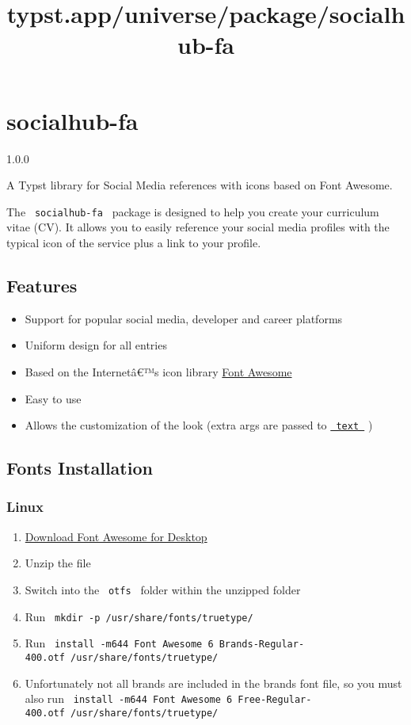 \title{typst.app/universe/package/socialhub-fa}

\label{banner}
\section{socialhub-fa}\label{socialhub-fa}

{ 1.0.0 }

A Typst library for Social Media references with icons based on Font
Awesome.

\label{readme}
The \texttt{\ socialhub-fa\ } package is designed to help you create
your curriculum vitae (CV). It allows you to easily reference your
social media profiles with the typical icon of the service plus a link
to your profile.

\subsection{Features}\label{features}

\begin{itemize}
\tightlist
\item
  Support for popular social media, developer and career platforms
\item
  Uniform design for all entries
\item
  Based on the Internetâ€™s icon library
  \href{https://fontawesome.com/}{Font Awesome}
\item
  Easy to use
\item
  Allows the customization of the look (extra args are passed to
  \href{https://typst.app/docs/reference/text/text/}{\texttt{\ text\ }}
  )
\end{itemize}

\subsection{Fonts Installation}\label{fonts-installation}

\subsubsection{Linux}\label{linux}

\begin{enumerate}
\tightlist
\item
  \href{https://fontawesome.com/download}{Download Font Awesome for
  Desktop}
\item
  Unzip the file
\item
  Switch into the \texttt{\ otfs\ } folder within the unzipped folder
\item
  Run \texttt{\ mkdir\ -p\ /usr/share/fonts/truetype/\ }
\item
  Run
  \texttt{\ install\ -m644\ \textquotesingle{}Font\ Awesome\ 6\ Brands-Regular-400.otf\textquotesingle{}\ /usr/share/fonts/truetype/\ }
\item
  Unfortunately not all brands are included in the brands font file, so
  you must also run
  \texttt{\ install\ -m644\ \textquotesingle{}Font\ Awesome\ 6\ Free-Regular-400.otf\textquotesingle{}\ /usr/share/fonts/truetype/\ }
\end{enumerate}

